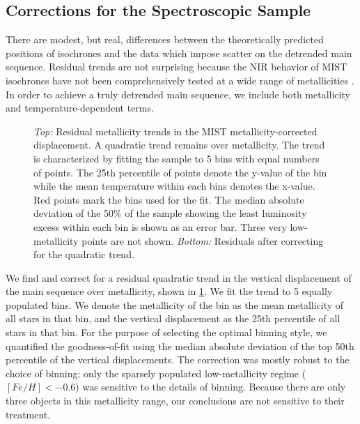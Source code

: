 \documentclass[manuscript]{aastex6}
\begin{document}
\subsection{Corrections for the Spectroscopic Sample}
\label{sec:speccor}

There are modest, but real, differences between the theoretically predicted
positions of isochrones and the data which impose scatter on the detrended main 
sequence. Residual trends are not surprising because the NIR behavior of MIST 
isochrones have not been comprehensively tested at a wide range of metallicities 
\citep{Choi16}.  In order to achieve a truly detrended main sequence, we include 
both metallicity and temperature-dependent terms.

\begin{figure}[htb]
    \centering
    \caption{\emph{Top:} Residual metallicity trends in the MIST 
        metallicity-corrected displacement. A quadratic trend remains over 
        metallicity. The trend is characterized by fitting the sample to 
        5 bins with equal numbers of points.  The 25th percentile of points 
        denote the y-value of the bin while the mean temperature within each
        bins denotes the x-value. Red points mark the bins used for the fit.
        The median absolute deviation of the 50\% of the sample showing the
        least luminosity excess within each bin is shown as an error bar. Three 
        very low-metallicity points are not shown.  \emph{Bottom:} Residuals 
        after correcting for the quadratic trend.}\label{fig:met_trend}
\end{figure}

We find and correct for a residual quadratic trend in the vertical 
displacement of the main sequence over metallicity, shown in 
\cref{fig:met_trend}.  We fit the trend to 5 equally populated bins. We denote 
the metallicity of the bin as the mean metallicity of all stars in that bin, 
and the vertical displacement as the 25th percentile of all stars in that bin. 
For the purpose of selecting the optimal binning style, we quantified the 
goodness-of-fit using the median absolute deviation of the top 50th percentile 
of the vertical displacements. The correction was mostly robust to the choice 
of binning; only the sparsely populated low-metallicity regime 
(\([Fe/H] < -0.6\)) was sensitive to the details of binning. Because there are 
only three objects in this metallicity range, our conclusions are not 
sensitive to their treatment.
\end{document}
